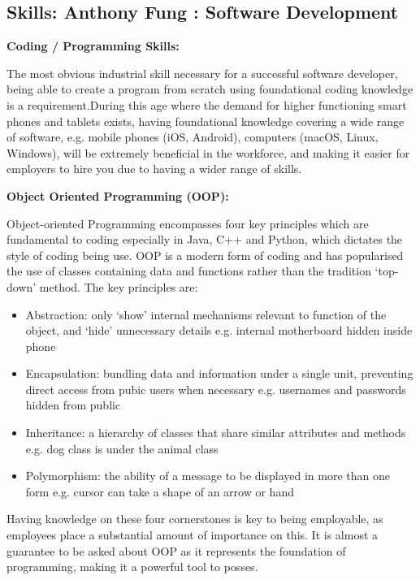 \documentclass[a4paper, 11pt]{report}
\begin{document}
\subsection{Skills: Anthony Fung : Software Development}
\indent\indent\textbf{Coding / Programming Skills:}
\par The most obvious industrial skill necessary for a successful software developer, being able to create a program from scratch using foundational coding knowledge is a requirement.During this age where the demand for higher functioning smart phones and tablets exists, having foundational knowledge covering a wide range of software, e.g. mobile phones (iOS, Android), computers (macOS, Linux, Windows), will be extremely beneficial in the workforce, and making it easier for employers to hire you due to having a wider range of skills.

\bigskip

\textbf{Object Oriented Programming (OOP):}
\par Object-oriented Programming encompasses four key principles which are fundamental to coding especially in Java, C++ and Python, which dictates the style of coding being use. OOP is a modern form of coding and has popularised the use of classes containing data and functions rather than the tradition `top-down' method. The key principles are:
\begin{itemize}
\itemsep0em
	\item Abstraction: only `show' internal mechanisms relevant to function of the object, and `hide' unnecessary details e.g. internal motherboard hidden inside phone
	\item Encapsulation: bundling data and information under a single unit, preventing direct access from pubic users when necessary e.g. usernames and passwords hidden from public
	\item Inheritance: a hierarchy of classes that share similar attributes and methods e.g. dog class is under the animal class
	\item Polymorphism: the ability of a message to be displayed in more than one form e.g. cursor can take a shape of an arrow or hand 
\end{itemize}
Having knowledge on these four cornerstones is key to being employable, as employees place a substantial amount of importance on this. It is almost a guarantee to be asked about OOP as it represents the foundation of programming, making it a powerful tool to posses.

\bigskip
\end{document}

